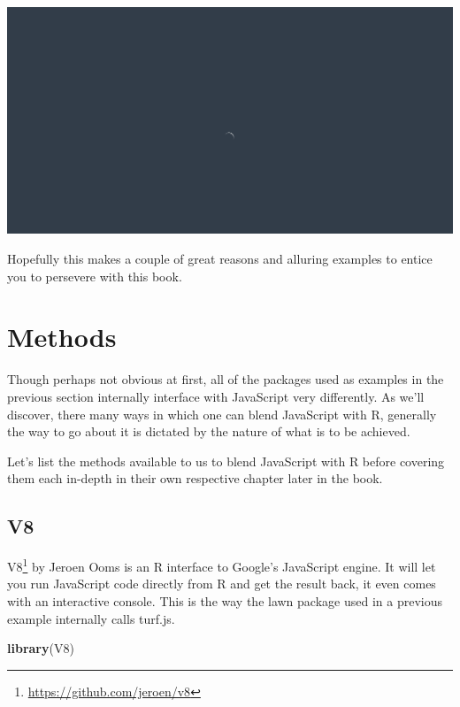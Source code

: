 \documentclass[
]{krantz}
\makeatletter
\newenvironment{Shaded}{\begin{snugshade}}{\end{snugshade}}
\newcommand{\KeywordTok}[1]{\textcolor[rgb]{0.27,0.27,0.27}{\textbf{#1}}}
\newcommand{\NormalTok}[1]{#1}
\renewcommand{\href}[2]{#2\footnote{\url{#1}}}
\newenvironment{kframe}{%
\medskip{}
\setlength{\fboxsep}{.8em}
 \def\at@end@of@kframe{}%
 \ifinner\ifhmode%
  \def\at@end@of@kframe{\end{minipage}}%
  \begin{minipage}{\columnwidth}%
 \fi\fi%
 \def\FrameCommand##1{\hskip\@totalleftmargin \hskip-\fboxsep
 \colorbox{shadecolor}{##1}\hskip-\fboxsep
     \hskip-\linewidth \hskip-\@totalleftmargin \hskip\columnwidth}%
 \MakeFramed {\advance\hsize-\width
   \@totalleftmargin\z@ \linewidth\hsize
   \@setminipage}}%
 {\par\unskip\endMakeFramed%
 \at@end@of@kframe}
\renewenvironment{Shaded}{\begin{kframe}}{\end{kframe}}
\makeatother
\begin{document}
\begin{flushleft}\includegraphics[width=6.25in]{images/waiter} \end{flushleft}

Hopefully this makes a couple of great reasons and alluring examples to entice you to persevere with this book.

\hypertarget{methods}{%
\section*{Methods}\label{methods}}


Though perhaps not obvious at first, all of the packages used as examples in the previous section internally interface with JavaScript very differently. As we'll discover, there many ways in which one can blend JavaScript with R, generally the way to go about it is dictated by the nature of what is to be achieved.

Let's list the methods available to us to blend JavaScript with R before covering them each in-depth in their own respective chapter later in the book.

\hypertarget{v8}{%
\subsection*{V8}\label{v8}}


\href{https://github.com/jeroen/v8}{V8} by Jeroen Ooms is an R interface to Google's JavaScript engine. It will let you run JavaScript code directly from R and get the result back, it even comes with an interactive console. This is the way the lawn package used in a previous example internally calls turf.js.

\begin{Shaded}
\begin{Highlighting}[]
\KeywordTok{library}\NormalTok{(V8)}
\end{Highlighting}
\end{Shaded}
\end{document}
